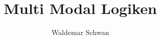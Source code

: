 \documentclass[a4paper, headsepline, footsepline]{scrbook}
\title{Multi Modal Logiken}
\author{Waldemar Schwan}
\begin{document}
	


\tableofcontents
\newpage







\begin{small}
	\renewcommand{\baselinestretch}{0.9}\normalsize
	
	
\end{small}

\renewcommand{\baselinestretch}{1.1}\normalsize

\end{document}

